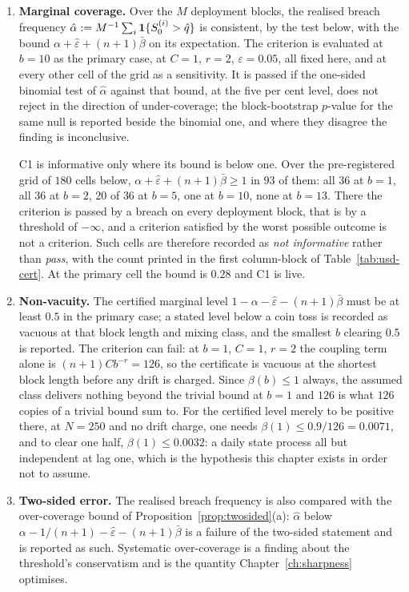\documentclass[../../../main.tex]{subfiles}
\begin{document}
\begin{enumerate}[label=\textbf{C\arabic*.},leftmargin=2.2\parindent]
\item \textbf{Marginal coverage.} Over the $M$ deployment blocks, the realised breach frequency $\hat\alpha:=M^{-1}\sum_{i}\mathbf{1}\{S_0^{(i)}>\hat q\}$ is consistent, by the test below, with the bound $\alpha+\hat\varepsilon+(n+1)\bar\beta$ on its expectation. The criterion is evaluated at $b=10$ as the primary case, at $C=1$, $r=2$, $\varepsilon=0.05$, all fixed here, and at every other cell of the grid as a sensitivity. It is passed if the one-sided binomial test of $\hat\alpha$ against that bound, at the five per cent level, does not reject in the direction of under-coverage; the block-bootstrap $p$-value for the same null is reported beside the binomial one, and where they disagree the finding is inconclusive.

C1 is informative only where its bound is below one. Over the pre-registered grid of $180$ cells below, $\alpha+\hat\varepsilon+(n+1)\bar\beta\ge1$ in $93$ of them: all $36$ at $b=1$, all $36$ at $b=2$, $20$ of $36$ at $b=5$, one at $b=10$, none at $b=13$. There the criterion is passed by a breach on every deployment block, that is by a threshold of $-\infty$, and a criterion satisfied by the worst possible outcome is not a criterion. Such cells are therefore recorded as \emph{not informative} rather than \emph{pass}, with the count printed in the first column-block of Table~\ref{tab:usd-cert}. At the primary cell the bound is $0.28$ and C1 is live.
\item \textbf{Non-vacuity.} The certified marginal level $1-\alpha-\hat\varepsilon-(n+1)\bar\beta$ must be at least $0.5$ in the primary case; a stated level below a coin toss is recorded as vacuous at that block length and mixing class, and the smallest $b$ clearing $0.5$ is reported. The criterion can fail: at $b=1$, $C=1$, $r=2$ the coupling term alone is $(n+1)Cb^{-r}=126$, so the certificate is vacuous at the shortest block length before any drift is charged. Since $\beta(b)\le1$ always, the assumed class delivers nothing beyond the trivial bound at $b=1$ and $126$ is what $126$ copies of a trivial bound sum to. For the certified level merely to be positive there, at $N=250$ and no drift charge, one needs $\beta(1)\le0.9/126=0.0071$, and to clear one half, $\beta(1)\le0.0032$: a daily state process all but independent at lag one, which is the hypothesis this chapter exists in order not to assume.
\item \textbf{Two-sided error.} The realised breach frequency is also compared with the over-coverage bound of Proposition~\ref{prop:twosided}(a): $\hat\alpha$ below $\alpha-1/(n+1)-\hat\varepsilon-(n+1)\bar\beta$ is a failure of the two-sided statement and is reported as such. Systematic over-coverage is a finding about the threshold's conservatism and is the quantity Chapter~\ref{ch:sharpness} optimises.


\end{enumerate}
\end{document}

